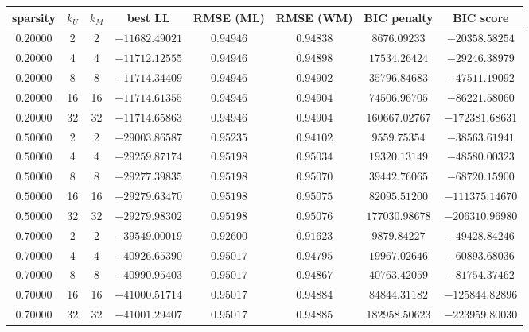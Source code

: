 \documentclass{article}
\begin{document}
\begin{center}
  \begin{tabular}{c|c|c|c|c|c|c|c}
      sparsity &   $k_U$ &   $k_M$ &       best LL &  RMSE (ML) &  RMSE (WM) & BIC penalty & BIC score \\
\hline
       $0.20000$ &    2 &    2 &  $-11682.49021$ &  $0.94946$ &  $0.94838$ &  $  8676.09233$ & $ -20358.58254$ \\
       $0.20000$ &    4 &    4 &  $-11712.12555$ &  $0.94946$ &  $0.94898$ &  $ 17534.26424$ & $ -29246.38979$ \\
       $0.20000$ &    8 &    8 &  $-11714.34409$ &  $0.94946$ &  $0.94902$ &  $ 35796.84683$ & $ -47511.19092$ \\
       $0.20000$ &   16 &   16 &  $-11714.61355$ &  $0.94946$ &  $0.94904$ &  $ 74506.96705$ & $ -86221.58060$ \\
       $0.20000$ &   32 &   32 &  $-11714.65863$ &  $0.94946$ &  $0.94904$ &  $160667.02767$ & $-172381.68631$ \\
       $0.50000$ &    2 &    2 &  $-29003.86587$ &  $0.95235$ &  $0.94102$ &  $  9559.75354$ & $ -38563.61941$ \\
       $0.50000$ &    4 &    4 &  $-29259.87174$ &  $0.95198$ &  $0.95034$ &  $ 19320.13149$ & $ -48580.00323$ \\
       $0.50000$ &    8 &    8 &  $-29277.39835$ &  $0.95198$ &  $0.95070$ &  $ 39442.76065$ & $ -68720.15900$ \\
       $0.50000$ &   16 &   16 &  $-29279.63470$ &  $0.95198$ &  $0.95075$ &  $ 82095.51200$ & $-111375.14670$ \\
       $0.50000$ &   32 &   32 &  $-29279.98302$ &  $0.95198$ &  $0.95076$ &  $177030.98678$ & $-206310.96980$ \\
       $0.70000$ &    2 &    2 &  $-39549.00019$ &  $0.92600$ &  $0.91623$ &  $  9879.84227$ & $ -49428.84246$ \\
       $0.70000$ &    4 &    4 &  $-40926.65390$ &  $0.95017$ &  $0.94795$ &  $ 19967.02646$ & $ -60893.68036$ \\
       $0.70000$ &    8 &    8 &  $-40990.95403$ &  $0.95017$ &  $0.94867$ &  $ 40763.42059$ & $ -81754.37462$ \\
       $0.70000$ &   16 &   16 &  $-41000.51714$ &  $0.95017$ &  $0.94884$ &  $ 84844.31182$ & $-125844.82896$ \\
       $0.70000$ &   32 &   32 &  $-41001.29407$ &  $0.95017$ &  $0.94885$ &  $182958.50623$ & $-223959.80030$
  \end{tabular}
\end{center}
\end{document}
